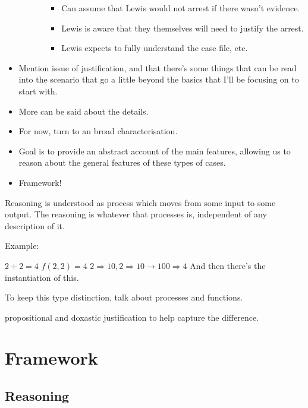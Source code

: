 \documentclass[10pt]{article}
\begin{document}
\begin{itemize}
\begin{itemize}
\begin{itemize}
      \begin{itemize}
      \item Can assume that Lewis would not arrest if there wasn't evidence.
      \item Lewis is aware that they themselves will need to justify the arrest.
      \item Lewis expects to fully understand the case file, etc.\
      \end{itemize}
    \end{itemize}
  \end{itemize}
\item Mention issue of justification, and that there's some things that can be read into the scenario that go a little beyond the basics that I'll be focusing on to start with.
\end{itemize}

\begin{itemize}
\item More can be said about the details.
\item For now, turn to an broad characterisation.
\item Goal is to provide an abstract account of the main features, allowing us to reason about the general features of these types of cases.
\item Framework!
\end{itemize}


\newpage



Reasoning is understood as process which moves from some input to some output.
The reasoning is whatever that processes is, independent of any description of it.

Example:

\(2 + 2 = 4\)
\(f(2,2) = 4\)
\(2 \Rightarrow 10, 2\Rightarrow 10 \rightarrow 100 \Rightarrow 4\)
And then there's the instantiation of this.

To keep this type distinction, talk about processes and functions.

propositional and doxastic justification to help capture the difference.



\newpage


\section{Framework}
\label{sec:framework-1}

\subsection{Reasoning}
\label{sec:reasoning}
\end{document}
